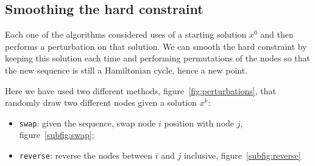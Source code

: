 \subsection{Smoothing the hard constraint}

Each one of the algorithms considered uses of a starting solution $x^0$ and then performs a perturbation on that solution. We can smooth the hard constraint by keeping this solution each time and performing permutations of the nodes so that the new sequence is still a Hamiltonian cycle, hence a new point.

Here we have used two different methods, figure~\vref{fig:perturbations}, that randomly draw two different nodes given a solution $x^k$:
\begin{itemize}
	\item \texttt{swap}: given the sequence, swap node $i$ position with node $j$, figure~\ref{subfig:swap};
	\item \texttt{reverse}: reverse the nodes between $i$ and $j$ inclusive, figure~\ref{subfig:reverse}
\end{itemize}


